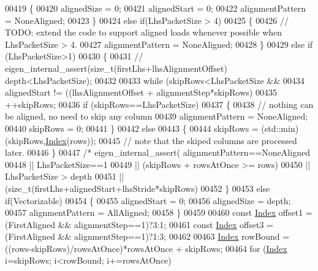 \begin{DoxyCode}
{00419   \{
00420     alignedSize = 0;
00421     alignedStart = 0;
00422     alignmentPattern = NoneAligned;
00423   \}
00424   \textcolor{keywordflow}{else} \textcolor{keywordflow}{if}(LhsPacketSize > 4)
00425   \{
00426     \textcolor{comment}{// TODO: extend the code to support aligned loads whenever possible when LhsPacketSize > 4.}
00427     alignmentPattern = NoneAligned;
00428   \}
00429   \textcolor{keywordflow}{else} \textcolor{keywordflow}{if} (LhsPacketSize>1)
00430   \{
00431   \textcolor{comment}{//    eigen\_internal\_assert(size\_t(firstLhs+lhsAlignmentOffset)%
       depth<LhsPacketSize);}
00432 
00433     \textcolor{keywordflow}{while} (skipRows<LhsPacketSize &&
00434            alignedStart != ((lhsAlignmentOffset + alignmentStep*skipRows)%
00435       ++skipRows;
00436     \textcolor{keywordflow}{if} (skipRows==LhsPacketSize)
00437     \{
00438       \textcolor{comment}{// nothing can be aligned, no need to skip any column}
00439       alignmentPattern = NoneAligned;
00440       skipRows = 0;
00441     \}
00442     \textcolor{keywordflow}{else}
00443     \{
00444       skipRows = (std::min)(skipRows,\hyperlink{namespace_eigen_a62e77e0933482dafde8fe197d9a2cfde}{Index}(rows));
00445       \textcolor{comment}{// note that the skiped columns are processed later.}
00446     \}
00447     \textcolor{comment}{/*    eigen\_internal\_assert(  alignmentPattern==NoneAligned}
00448 \textcolor{comment}{                      || LhsPacketSize==1}
00449 \textcolor{comment}{                      || (skipRows + rowsAtOnce >= rows)}
00450 \textcolor{comment}{                      || LhsPacketSize > depth}
00451 \textcolor{comment}{                      || (size\_t(firstLhs+alignedStart+lhsStride*skipRows)%
00452   \}
00453   \textcolor{keywordflow}{else} \textcolor{keywordflow}{if}(Vectorizable)
00454   \{
00455     alignedStart = 0;
00456     alignedSize = depth;
00457     alignmentPattern = AllAligned;
00458   \}
00459 
00460   \textcolor{keyword}{const} \hyperlink{namespace_eigen_a62e77e0933482dafde8fe197d9a2cfde}{Index} offset1 = (FirstAligned && alignmentStep==1)?3:1;
00461   \textcolor{keyword}{const} \hyperlink{namespace_eigen_a62e77e0933482dafde8fe197d9a2cfde}{Index} offset3 = (FirstAligned && alignmentStep==1)?1:3;
00462 
00463   \hyperlink{namespace_eigen_a62e77e0933482dafde8fe197d9a2cfde}{Index} rowBound = ((rows-skipRows)/rowsAtOnce)*rowsAtOnce + skipRows;
00464   \textcolor{keywordflow}{for} (\hyperlink{namespace_eigen_a62e77e0933482dafde8fe197d9a2cfde}{Index} i=skipRows; i<rowBound; i+=rowsAtOnce)
}}
\end{DoxyCode}
